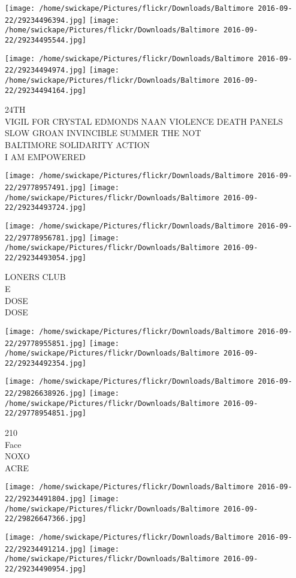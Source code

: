\documentclass[10pt,letterpaper]{article}
\begin{document}
\texttt{[image: /home/swickape/Pictures/flickr/Downloads/Baltimore 2016-09-22/29234496394.jpg]}
\texttt{[image: /home/swickape/Pictures/flickr/Downloads/Baltimore 2016-09-22/29234495544.jpg]}

\texttt{[image: /home/swickape/Pictures/flickr/Downloads/Baltimore 2016-09-22/29234494974.jpg]}
\texttt{[image: /home/swickape/Pictures/flickr/Downloads/Baltimore 2016-09-22/29234494164.jpg]}

24TH\\
VIGIL FOR CRYSTAL EDMONDS NAAN VIOLENCE DEATH PANELS SLOW GROAN INVINCIBLE SUMMER THE NOT\\
BALTIMORE SOLIDARITY ACTION\\
I AM EMPOWERED
\pagebreak

\texttt{[image: /home/swickape/Pictures/flickr/Downloads/Baltimore 2016-09-22/29778957491.jpg]}
\texttt{[image: /home/swickape/Pictures/flickr/Downloads/Baltimore 2016-09-22/29234493724.jpg]}

\texttt{[image: /home/swickape/Pictures/flickr/Downloads/Baltimore 2016-09-22/29778956781.jpg]}
\texttt{[image: /home/swickape/Pictures/flickr/Downloads/Baltimore 2016-09-22/29234493054.jpg]}

LONERS CLUB\\
E\\
DOSE\\
DOSE
\pagebreak

\texttt{[image: /home/swickape/Pictures/flickr/Downloads/Baltimore 2016-09-22/29778955851.jpg]}
\texttt{[image: /home/swickape/Pictures/flickr/Downloads/Baltimore 2016-09-22/29234492354.jpg]}

\texttt{[image: /home/swickape/Pictures/flickr/Downloads/Baltimore 2016-09-22/29826638926.jpg]}
\texttt{[image: /home/swickape/Pictures/flickr/Downloads/Baltimore 2016-09-22/29778954851.jpg]}

210\\
Face\\
NOXO\\
ACRE
\pagebreak

\texttt{[image: /home/swickape/Pictures/flickr/Downloads/Baltimore 2016-09-22/29234491804.jpg]}
\texttt{[image: /home/swickape/Pictures/flickr/Downloads/Baltimore 2016-09-22/29826647366.jpg]}

\texttt{[image: /home/swickape/Pictures/flickr/Downloads/Baltimore 2016-09-22/29234491214.jpg]}
\texttt{[image: /home/swickape/Pictures/flickr/Downloads/Baltimore 2016-09-22/29234490954.jpg]}
\end{document}
